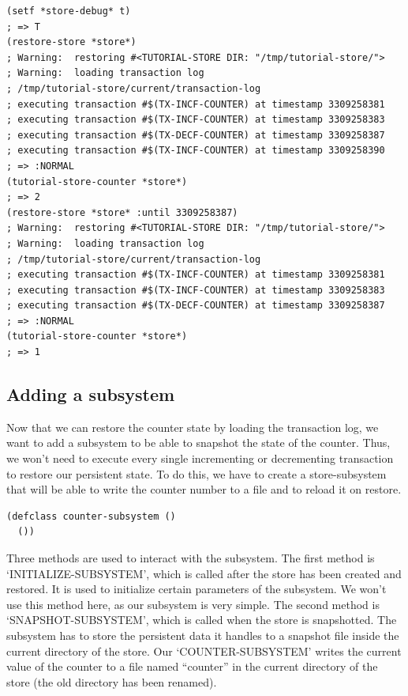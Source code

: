 \begin{Verbatim}[fontsize=\small,frame=leftline,framerule=0.9mm,rulecolor=\color{gray},framesep=5.1mm,xleftmargin=5mm,fontfamily=cmtt]
(setf *store-debug* t)
; => T
(restore-store *store*)
; Warning:  restoring #<TUTORIAL-STORE DIR: "/tmp/tutorial-store/">
; Warning:  loading transaction log
; /tmp/tutorial-store/current/transaction-log
; executing transaction #$(TX-INCF-COUNTER) at timestamp 3309258381
; executing transaction #$(TX-INCF-COUNTER) at timestamp 3309258383
; executing transaction #$(TX-DECF-COUNTER) at timestamp 3309258387
; executing transaction #$(TX-INCF-COUNTER) at timestamp 3309258390
; => :NORMAL
(tutorial-store-counter *store*)
; => 2
(restore-store *store* :until 3309258387)
; Warning:  restoring #<TUTORIAL-STORE DIR: "/tmp/tutorial-store/">
; Warning:  loading transaction log
; /tmp/tutorial-store/current/transaction-log
; executing transaction #$(TX-INCF-COUNTER) at timestamp 3309258381
; executing transaction #$(TX-INCF-COUNTER) at timestamp 3309258383
; executing transaction #$(TX-DECF-COUNTER) at timestamp 3309258387
; => :NORMAL
(tutorial-store-counter *store*)
; => 1
\end{Verbatim}


\subsection{ Adding a subsystem}
Now that we can restore the counter state by loading the
transaction log, we want to add a subsystem to be able to snapshot
the state of the counter. Thus, we won't need to execute every
single incrementing or decrementing transaction to restore our
persistent state.
To do this, we have to create a store-subsystem that will be able
to write the counter number to a file and to reload it on restore.

\begin{Verbatim}[fontsize=\small,frame=leftline,framerule=0.9mm,rulecolor=\color{gray},framesep=5.1mm,xleftmargin=5mm,fontfamily=cmtt]
(defclass counter-subsystem ()
  ())
\end{Verbatim}
Three methods are used to interact with the subsystem.
The first method is `INITIALIZE-SUBSYSTEM', which is called after
the store has been created and restored. It is used to initialize
certain parameters of the subsystem. We won't use this method
here, as our subsystem is very simple.
The second method is `SNAPSHOT-SUBSYSTEM', which is called when
the store is snapshotted. The subsystem has to store the
persistent data it handles to a snapshot file inside the current
directory of the store. Our `COUNTER-SUBSYSTEM' writes the current
value of the counter to a file named ``counter'' in the current
directory of the store (the old directory has been renamed).

